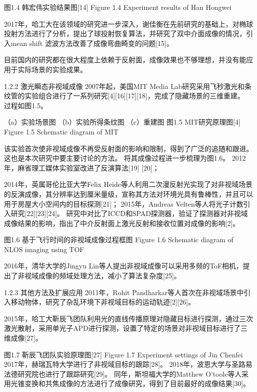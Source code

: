  
图1.4  韩宏伟实验结果图[14]
Figure 1.4 Experiment results of Han Hongwei

2017年，哈工大在该领域的研究进一步深入，谢佳衡在先前研究的基础上，对椭球投射方法进行了分析，提出了球投射恢复算法，并研究了双中介面成像的情况，引入mean shift 滤波方法改善了成像弯曲畸变的问题[15]。

目前国内的研究都在很大程度上依赖于反射面，成像效果也不够理想，并没有能应用于实际场景的实验成果。


1.2.2  激光瞬态非视域成像
2007年起，美国MIT Media Lab研究采用飞秒激光和条纹管的实验组合进行了一系列研究[4][16][17][18]，完成了隐藏场景的三维重建。
过程如图1.5。


 
（a）实验场景图 （b）实验所得条纹图 （c）重建图
图1.5  MIT研究原理图[4]
Figure 1.5 Schematic diagram of MIT

该实验首次使非视域成像不再受反射面的影响和限制，得到了广泛的追随和跟进。
这也是本次研究中要主要讨论的方法。
将其成像过程进一步梳理为图1.6。
2012年，麻省理工媒体实验室改进了反演算法[19] [20]；

2014年，英属哥伦比亚大学Felix Heide等人利用二次漫反射光实现了对非视域场景的反演成像，其分辨率达到厘米量级，宣称其方法对环境光具有鲁棒性，并且可以用于房屋大小空间内的目标探测[21]；
2015年，Andreas Velten等人将光子计数引入研究[22][23][24]。
研究中对比了ICCD和SPAD探测器，验证了探测器对非视域成像结果的影响，指出了中介反射面上激光反射和接收位置对成像的影响[2]。

 
图1.6  基于飞行时间的非视域成像过程框图
Figure 1.6 Schematic diagram of NLOS imaging using TOF

2016年，清华大学的Jingyu Lin等人提出非视域成像可以采用多频的ToF相机，提出了非视域成像的频域处理方法，减小了算法复杂度[25]。

1.2.3  其他方法及扩展应用
2011年，Rohit Pandharkar等人首次在非视域场景中引入移动物体，研究了杂乱环境下非视域目标的运动轨迹[2][26]。

2015年，哈工大靳辰飞团队利用光的直线传播原理对隐藏目标进行探测，通过三次激光散射，采用单光子APD进行探测，设置了特定的场景对非视域目标进行了三维成像[27]。


 
图1.7  靳辰飞团队实验原理图[27]
Figure 1.7 Experiment settings of Jin Chenfei
2017年，赫瑞瓦特大学进行了非视域目标的跟踪[28]。
2018年，波恩大学与圣路易法德研究院也进行了跟踪研究[29]。
同年，斯坦福大学的Matthew O’toole等人采用光锥变换和共焦成像的方法进行了成像研究，得到了目前最好的成像结果[30]。



